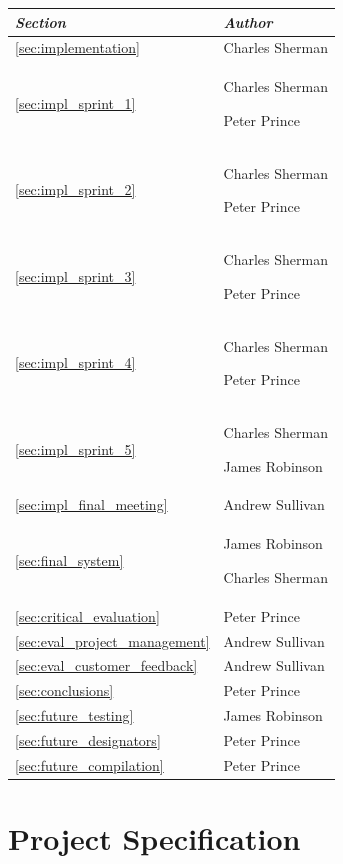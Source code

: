 \documentclass[a4paper, 12pt, twoside]{article}
\newcommand*{\fullref}[1]{\ref{#1} \nameref{#1}}
\begin{document}
\begin{tabularx}{\textwidth}{|X|X|} \hline
  \emph{Section}                         & \emph{Author}                      \\ \hline
  \fullref{sec:implementation}           & Charles Sherman                    \\
  \fullref{sec:impl_sprint_1}            & Charles Sherman\par Peter Prince   \\
  \fullref{sec:impl_sprint_2}            & Charles Sherman\par Peter Prince   \\
  \fullref{sec:impl_sprint_3}            & Charles Sherman\par Peter Prince   \\
  \fullref{sec:impl_sprint_4}            & Charles Sherman\par Peter Prince   \\
  \fullref{sec:impl_sprint_5}            & Charles Sherman\par James Robinson \\
  \fullref{sec:impl_final_meeting}       & Andrew Sullivan                    \\ \hline
  \fullref{sec:final_system}             & James Robinson\par Charles Sherman \\ \hline
  \fullref{sec:critical_evaluation}      & Peter Prince                       \\
  \fullref{sec:eval_project_management}  & Andrew Sullivan                                  \\
  \fullref{sec:eval_customer_feedback}   & Andrew Sullivan                    \\ \hline
  \fullref{sec:conclusions}              & Peter Prince                       \\ \hline
  \fullref{sec:future_testing}           & James Robinson                     \\
  \fullref{sec:future_designators}       & Peter Prince                       \\
  \fullref{sec:future_compilation}       & Peter Prince                       \\ \hline
\end{tabularx}

\section{Project Specification}
\end{document}
